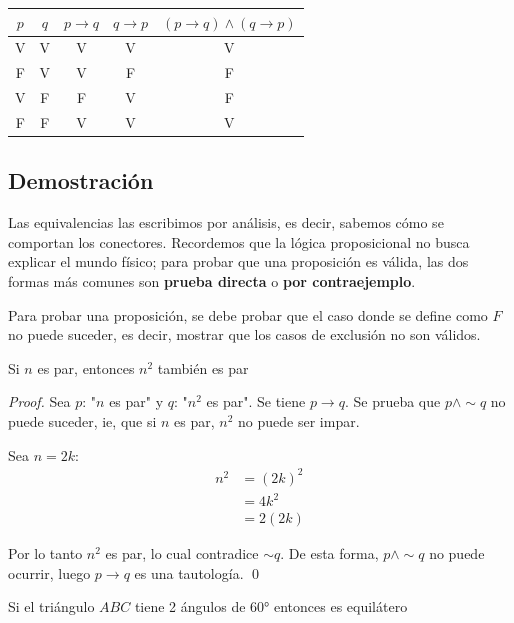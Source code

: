 \documentclass{book}
\begin{document}
  \begin{tabular}{c|c|c|c|c}
  $p$ & $q$ & $p \to q$ & $q \to p$ & $(p \to q) \land (q \to p)$ \\
  \hline
  V & V & V & V & V \\
  F & V & V & F & F \\
  V & F & F & V & F \\
  F & F & V & V & V \\
  \end{tabular}
  
  \subsection{Demostración}
  
  Las equivalencias las escribimos por análisis, es decir, sabemos cómo se comportan los
  conectores. Recordemos que la lógica proposicional no busca explicar el mundo físico;
  para probar que una proposición es válida, las dos formas más comunes son
  \textbf{prueba directa} o \textbf{por contraejemplo}.

  Para probar una proposición, se debe probar que el caso donde se define como $F$
  no puede suceder, es decir, mostrar que los casos de exclusión no son válidos.
  
  \begin{proposition}
    Si $n$ es par, entonces $n^2$ también es par
    \begin{proof}
      Sea $p$: "$n$ es par" y $q$: "$n^2$ es par". Se tiene $p \to q$.
      Se prueba que $p \land \sim q$ no puede suceder, ie, que si $n$ es par, $n^2$ no puede ser impar.
      
      Sea $n = 2k$:
      \begin{align}
      n^2 &= (2k)^2 \\
          &= 4k^2 \\
          &= 2(2k)
      \end{align}
      
      Por lo tanto $n^2$ es par, lo cual contradice $\sim q$. De esta forma, $p \land \sim q$
      no puede ocurrir, luego $p \to q$ es una tautología. \qed
    \end{proof}
  \end{proposition}
  
  
  \begin{proposition}
    Si el triángulo $ABC$ tiene 2 ángulos de $60°$ entonces es equilátero
  \end{proposition}
  
\end{document}
